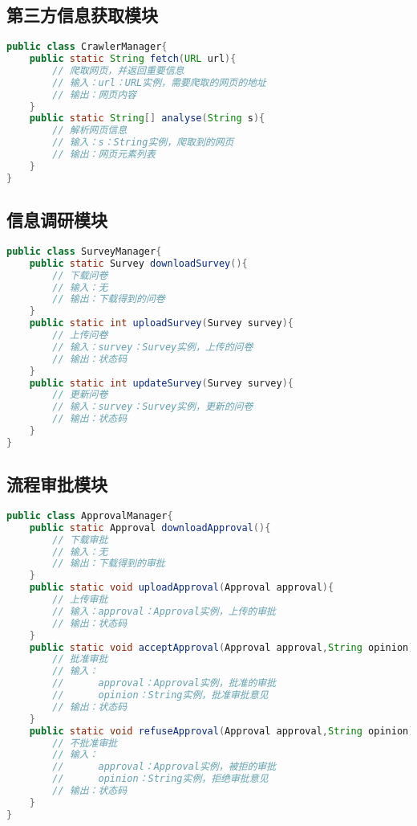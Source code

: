 {\color{red}

\subsection{\color{red} 第三方信息获取模块}
\begin{lstlisting}[language=Java, caption=爬虫模块接口]
public class CrawlerManager{
    public static String fetch(URL url){
        // 爬取网页，并返回重要信息
        // 输入：url：URL实例，需要爬取的网页的地址
        // 输出：网页内容
    } 
    public static String[] analyse(String s){
        // 解析网页信息
        // 输入：s：String实例，爬取到的网页
        // 输出：网页元素列表
    }
}
\end{lstlisting}

\subsection{\color{red}信息调研模块}
\begin{lstlisting}[language=Java, caption=信息调研模块接口]
public class SurveyManager{
    public static Survey downloadSurvey(){
        // 下载问卷
        // 输入：无
        // 输出：下载得到的问卷
    }
    public static int uploadSurvey(Survey survey){
        // 上传问卷
        // 输入：survey：Survey实例，上传的问卷
        // 输出：状态码
    }
    public static int updateSurvey(Survey survey){
        // 更新问卷
        // 输入：survey：Survey实例，更新的问卷
        // 输出：状态码
    }
}
\end{lstlisting}


\subsection{\color{red}流程审批模块}
\begin{lstlisting}[language=Java, caption=流程模块接口]
public class ApprovalManager{
    public static Approval downloadApproval(){
        // 下载审批
        // 输入：无
        // 输出：下载得到的审批
    }
    public static void uploadApproval(Approval approval){
        // 上传审批
        // 输入：approval：Approval实例，上传的审批
        // 输出：状态码
    }
    public static void acceptApproval(Approval approval,String opinion){
        // 批准审批
        // 输入：
        //      approval：Approval实例，批准的审批
        //      opinion：String实例，批准审批意见
        // 输出：状态码
    }
    public static void refuseApproval(Approval approval,String opinion){
        // 不批准审批
        // 输入：
        //      approval：Approval实例，被拒的审批
        //      opinion：String实例，拒绝审批意见
        // 输出：状态码
    }
}
\end{lstlisting}


}
